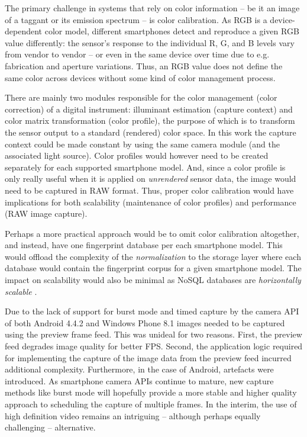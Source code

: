 \documentclass[thesis.tex]{subfiles}
\begin{document}
The primary challenge in systems that rely on color information -- be it an image of a taggant or its emission spectrum -- is color calibration. As RGB is a device-dependent color model, different smartphones detect and reproduce a given RGB value differently: the sensor's response to the individual R, G, and B levels vary from vendor to vendor -- or even in the same device over time due to e.g. fabrication and aperture variations. Thus, an RGB value does not define the same color across devices without some kind of color management process.

There are mainly two modules responsible for the color management (color correction) of a digital instrument: illuminant estimation (capture context) and color matrix transformation (color profile), the purpose of which is to transform the sensor output to a standard (rendered) color space. In this work the capture context could be made constant by using the same camera module (and the associated light source). Color profiles would however need to be created separately for each supported smartphone model. And, since a color profile is only really useful when it is applied on \emph{unrendered} sensor data, the image would need to be captured in RAW format. Thus, proper color calibration would have implications for both scalability (maintenance of color profiles) and performance (RAW image capture). \cite{multiple_cameras} \cite{color_correction_pipeline}

Perhaps a more practical approach would be to omit color calibration altogether, and instead, have one fingerprint database per each smartphone model. This would offload the complexity of the \emph{normalization} to the storage layer where each database would contain the fingerprint corpus for a given smartphone model. The impact on scalability would also be minimal as NoSQL databases are \emph{horizontally scalable} \cite{nosql_scalability}.

Due to the lack of support for burst mode and timed capture by the camera API of both Android 4.4.2 and Windows Phone 8.1 images needed to be captured using the preview frame feed. This was unideal for two reasons. First, the preview feed degrades image quality for better FPS. Second, the application logic required for implementing the capture of the image data from the preview feed incurred additional complexity. Furthermore, in the case of Android, artefacts were introduced. As smartphone camera APIs continue to mature, new capture methods like burst mode will hopefully provide a more stable and higher quality approach to scheduling the capture of multiple frames. In the interim, the use of high definition video remains an intriguing -- although perhaps equally challenging -- alternative.
\end{document}
